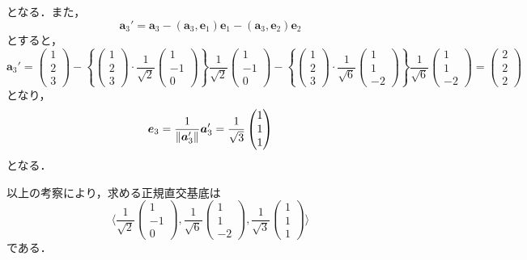 \documentclass[a4paper,10pt,fleqn]{ltjsarticle}
\begin{document}
\begin{tleftbar}
\[  \]
  となる．また，
  \[
    \bm{a}_3 ' = \bm{a}_3 - (\bm{a}_3,\bm{e}_1)\bm{e}_1 -(\bm{a}_3,\bm{e}_2)\bm{e}_2
  \]
  とすると，
  \[
    \bm{a}_3'  = \begin{pmatrix} 1 \\ 2 \\ 3 \end{pmatrix} - \left \{ \begin{pmatrix} 1 \\ 2\\ 3 \end{pmatrix} \cdot \frac{1}{\sqrt{2}} \begin{pmatrix} 1 \\ -1 \\ 0 \end{pmatrix} \right \} \frac{1}{\sqrt{2}} \begin{pmatrix} 1 \\ -1 \\ 0 \end{pmatrix}- \left \{ \begin{pmatrix} 1 \\ 2 \\ 3 \end{pmatrix} \cdot  \frac{1}{\sqrt{6}} \begin{pmatrix} 1 \\ 1\\ -2 \end{pmatrix} \right \}  \frac{1}{\sqrt{6}} \begin{pmatrix} 1 \\ 1\\ -2 \end{pmatrix} =\begin{pmatrix} 2 \\ 2 \\ 2 \end{pmatrix}
  \]
  となり，
  \[
    \bm{e}_3 = \frac{1}{\norm{\bm{a}_3 ' }} \bm{a}_3 ' = \frac{1}{\sqrt{3}} \begin{pmatrix} 1 \\ 1 \\ 1 \end{pmatrix}
  \]
  となる．

  以上の考察により，求める正規直交基底は
  \[
    \langle \frac{1}{\sqrt{2}} \begin{pmatrix} 1 \\ -1 \\ 0 \end{pmatrix} , \frac{1}{\sqrt{6}} \begin{pmatrix} 1 \\ 1\\ -2 \end{pmatrix} ,  \frac{1}{\sqrt{3}} \begin{pmatrix} 1 \\ 1 \\ 1 \end{pmatrix} \rangle
  \]
  である．
\end{tleftbar}
\newpage
\end{document}
